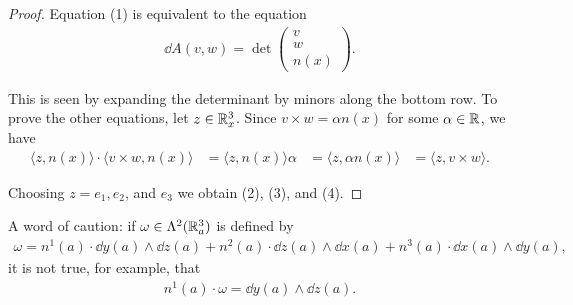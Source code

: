 \begin{proof}
  Equation (1) is equivalent to the equation
  \begin{align*}
    \dd A(v, w) = \det 
    \begin{pmatrix}
        v\\ w\\ n(x)
    \end{pmatrix}.
  \end{align*}

  This is seen by expanding the determinant by minors along the bottom row.
  To prove the other equations, let $z\in\mathbb{R}^3_x$. Since $v\times w=\alpha n(x)$ for some 
  $\alpha\in\mathbb{R}$, we have 
  \begin{align*}
    \langle z, n(x)\rangle\cdot \langle v\times w, n(x)\rangle
    & = \langle z, n(x)\rangle\alpha 
    & = \langle z, \alpha n(x)\rangle
    & = \langle z, v\times w\rangle.
  \end{align*}

  Choosing $z=e_1, e_2$, and $e_3$ we obtain (2), (3), and (4).
\end{proof}


A word of caution: if $\omega\in \Lambda^2(\mathbb{R}^3_a)$ is defined by 
\begin{align*}
    \omega
    = n^1(a)\cdot \dd y(a)\wedge\dd z(a)
    + n^{2}(a)\cdot\dd z(a)\wedge\dd x(a)
    + n^{3}(a)\cdot\dd x(a)\wedge\dd y(a),
\end{align*}
it is not true, for example, that
\begin{align*}
    n^1(a)\cdot\omega = \dd y(a)\wedge\dd z(a).
\end{align*}


